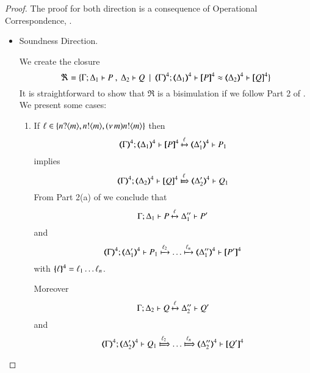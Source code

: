 \begin{proof}
	The proof for both direction is a consequence of Operational Correspondence,
	.

	\begin{itemize}
	\item	Soundness Direction.

	\noi We create the closure
%
	\[
		\Re = \set{\horel{\Gamma}{\Delta_1}{P}{\ ,\ }{\Delta_2}{Q} \setbar \horel{\tmap{\Gamma}{4}}{\tmap{\Delta_1}{4}}{\pmap{P}{4}}{\wb}{\tmap{\Delta_2}{4}}{\pmap{Q}{4}}}
	\]
%
	\noi	It is straightforward to show that $\Re$ is a bisimulation if we follow Part 2 of . We
	present some cases:
	\begin{enumerate}
		\item	If $\ell \in \{n ? \langle m \rangle, n ! \langle m \rangle, (\nu\, m) n ! \langle m \rangle\}$ then
		\[
		\horel{\tmap{\Gamma}{4}}{\tmap{\Delta_1}{4}}{\pmap{P}{4}}{\hby{\ell}}{\tmap{\Delta_1'}{4}}{P_1}
		\]
		implies
		\[
		\horel{\tmap{\Gamma}{4}}{\tmap{\Delta_2}{4}}{\pmap{Q}{4}}{\Hby{\ell}}{\tmap{\Delta_2'}{4}}{Q_1}
		\]
		From Part 2(a) of  we conclude that
		\[
		\Gamma; \Delta_1 \vdash P \xmapsto{\ell} \Delta_1'' \vdash P'
		\]
		and
		\[
		\horel{\tmap{\Gamma}{4}}{\tmap{\Delta_1'}{4}}{P_1}{\hby{\ell_2} \dots \hby{\ell_n}}
		{\tmap{\Delta_1''}{4}}{\pmap{P'}{4}}
		\]
		with $\{\!\!\{\ell\}\!\!\}^{4} = \ell_1 \dots \ell_n$.
		
		Moreover 
		\[
			\Gamma; \Delta_2 \vdash Q \xmapsto{\ell} \Delta_2'' \vdash Q'
		\]
		and
		\[
		\horel{\tmap{\Gamma}{4}}{\tmap{\Delta_2'}{4}}{Q_1}{\Hby{\ell_2} \dots \Hby{\ell_n}}
		{\tmap{\Delta_2''}{4}}{\pmap{Q'}{4}}
		\]
		

\end{enumerate}
\end{itemize}
\end{proof}
